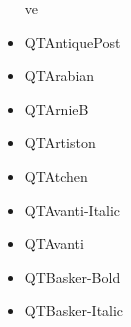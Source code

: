 \documentclass[12pt]{article}
\begin{document}
\begin{itemize}
ve\item QTAntiquePost\item QTArabian\item QTArnieB\item QTArtiston\item QTAtchen\item QTAvanti-Italic\item QTAvanti\item QTBasker-Bold\item QTBasker-Italic\it
\end{itemize}
\end{document}
